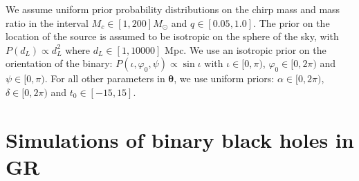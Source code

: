 \documentclass[prd,preprintnumbers,twocolumn,eqsecnum,floatfix,a4paper,nofootinbib,superscriptaddress]{revtex4}
\newcommand{\btheta}{\bm{\theta}}
\begin{document}
We assume uniform prior probability distributions on the chirp mass and mass ratio in the interval $M_c \in [1,200] M_\odot$ and $q \in [0.05,1.0]$. The prior on the location of the source is  assumed to be isotropic on the sphere of  the  sky,  with $P({d_L}) \propto d_{L}^{2}$ where $d_L \in [1,10000]$ Mpc. We use an  isotropic  prior  on  the  orientation  of  the  binary: $P({\iota,\varphi_0,\psi}) \propto \sin\iota$ with $\iota \in [0,\pi)$, $\varphi_0 \in [0,2\pi)$ and $\psi \in [0,\pi)$. For all other parameters in $\btheta$, we use uniform priors: $\alpha \in [0,2\pi)$, $\delta \in [0,2\pi)$ and $t_0 \in [-15,15]$. 

\section{Simulations of binary black holes in GR}
\label{sec:simulations}
\end{document}
